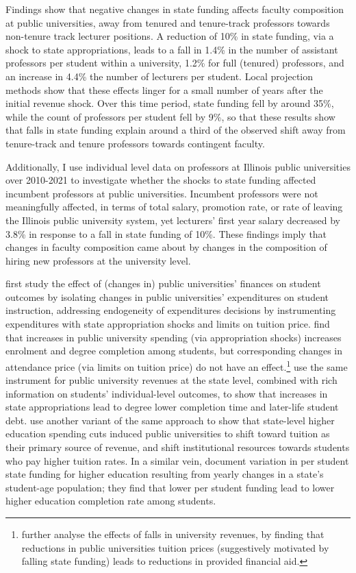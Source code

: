 Findings show that negative changes in state funding affects faculty composition at public universities, away from tenured and tenure-track professors towards non-tenure track lecturer positions.
A reduction of 10\% in state funding, via a shock to state appropriations, leads to a fall in 1.4\% in the number of assistant professors per student within a university, 1.2\% for full (tenured) professors, and an increase in 4.4\% the number of lecturers per student.
Local projection methods show that these effects linger for a small number of years after the initial revenue shock.
Over this time period, state funding fell by around 35\%, while the count of professors per student fell by 9\%, so that these results show that falls in state funding explain around a third of the observed shift away from tenure-track and tenure professors towards contingent faculty.

Additionally, I use individual level data on professors at Illinois public universities over 2010-2021 to investigate whether the shocks to state funding affected incumbent professors at public universities.
Incumbent professors were not meaningfully affected, in terms of total salary, promotion rate, or rate of leaving the Illinois public university system, yet lecturers' first year salary decreased by 3.8\% in response to a fall in state funding of 10\%.
These findings imply that changes in faculty composition came about by changes in the composition of hiring new professors at the university level.

\cite{NBERw23736} first study the effect of (changes in) public universities' finances on student outcomes by isolating changes in public universities' expenditures on student instruction, addressing endogeneity of expenditures decisions by instrumenting expenditures with state appropriation shocks and limits on tuition price.
\cite{NBERw23736} find that increases in public university spending (via appropriation shocks) increases enrolment and degree completion among students, but corresponding changes in attendance price (via limits on tuition price) do not have an effect.\footnote{
    \cite{miller2022making} further analyse the effects of falls in university revenues, by finding that reductions in public universities tuition prices (suggestively motivated by falling state funding) leads to reductions in provided financial aid.
}
\cite{chakrabarti2018effect,NBERw27885} use the same instrument for public university revenues at the state level, combined with rich information on students' individual-level outcomes, to show that increases in state appropriations lead to degree lower completion time and later-life student debt.
\cite{bound2019public} use another variant of the same approach to show that state-level higher education spending cuts induced public universities to shift toward tuition as their primary source of revenue, and shift institutional resources towards students who pay higher tuition rates.
In a similar vein, \cite{bound2007cohort} document variation in per student state funding for higher education resulting from yearly changes in a state's student-age population; they find that lower per student funding lead to lower higher education completion rate among students.

